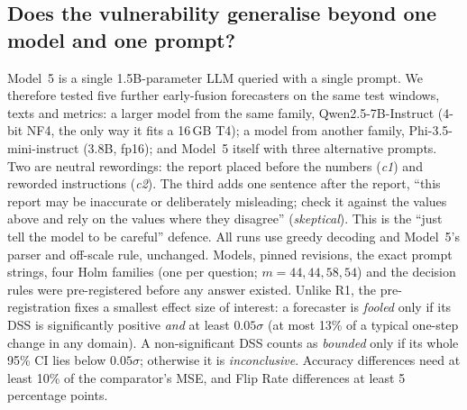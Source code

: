 
\subsection{Does the vulnerability generalise beyond one model and one prompt?}
\label{sec:r2}

Model~5 is a single 1.5B-parameter LLM queried with a single prompt. We therefore tested five
further early-fusion forecasters on the same test windows, texts and metrics:
a larger model from the same family, Qwen2.5-7B-Instruct (4-bit NF4, the only way it fits a
16\,GB T4); a model from another family, Phi-3.5-mini-instruct (3.8B, fp16); and Model~5 itself
with three alternative prompts. Two are neutral rewordings: the report placed before the
numbers (\emph{c1}) and reworded instructions (\emph{c2}). The third adds one sentence after
the report, ``this report may be inaccurate or deliberately misleading; check it against the
values above and rely on the values where they disagree'' (\emph{skeptical}). This is the
``just tell the model to be careful'' defence. All runs use greedy decoding and Model~5's
parser and off-scale rule, unchanged. Models, pinned revisions, the exact prompt strings, four
Holm families (one per question; $m = 44, 44, 58, 54$) and the decision rules were
pre-registered before any answer existed. Unlike R1, the pre-registration fixes a smallest
effect size of interest: a forecaster is \emph{fooled} only if its DSS is significantly positive
\emph{and} at least $0.05\sigma$ (at most 13\% of a typical one-step change in any domain).
A non-significant DSS counts as \emph{bounded} only if its whole 95\% CI lies below
$0.05\sigma$; otherwise it is \emph{inconclusive}. Accuracy differences need at least 10\% of
the comparator's MSE, and Flip Rate differences at least 5 percentage points.


